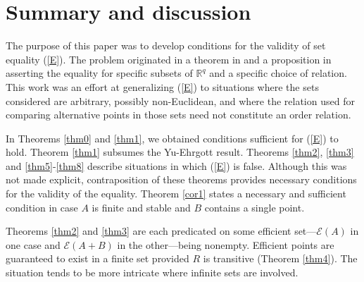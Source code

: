 \documentclass[pdflatex,sn-apa,11pt]{sn-jnl}%
\newtheorem{lemma}{Lemma}
\begin{document}


\section{Summary and discussion}
\label{sec4}
The purpose of this paper was to develop conditions for the validity of set equality (\ref{E}). The problem originated in a theorem in \cite{yu1985multiple} and a proposition in \cite{ehrgott2005multicriteria} asserting the equality for specific subsets of $\mathbb{R}^{q}$ and a specific choice of relation. This work was an effort at generalizing (\ref{E}) to situations where the sets considered are arbitrary, possibly non-Euclidean, and where the relation used for comparing alternative points in those sets need not constitute an order relation.

In Theorems \ref{thm0} and \ref{thm1}, we obtained conditions sufficient for (\ref{E}) to hold. Theorem \ref{thm1} subsumes the Yu-Ehrgott result. Theorems \ref{thm2}, \ref{thm3} and \ref{thm5}-\ref{thm8} describe situations in which (\ref{E}) is false. Although this was not made explicit, contraposition of these theorems provides necessary conditions for the validity of the equality. Theorem \ref{cor1} states a necessary and sufficient condition in case $A$ is finite and stable and $B$ contains a single point. 

Theorems \ref{thm2} and \ref{thm3} are each predicated on some efficient set---$\mathscr{E}(A)$ in one case and $\mathscr{E}(A+B)$ in the other---being nonempty. Efficient points are guaranteed to exist in a finite set provided $R$ is transitive (Theorem \ref{thm4}). The situation tends to be more intricate where infinite sets are involved.
\end{document}
